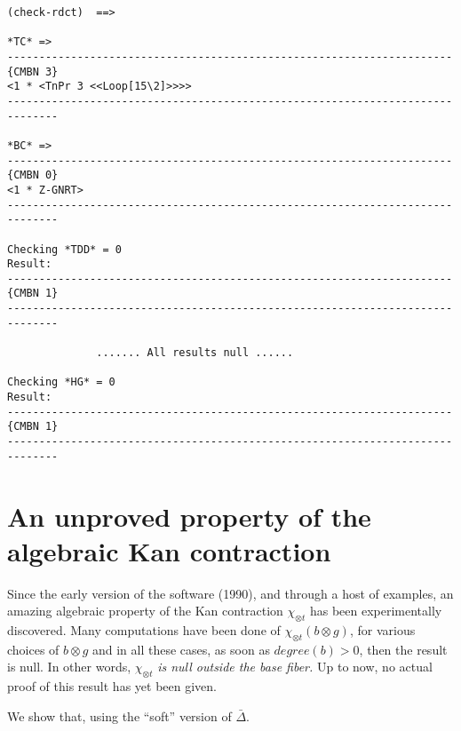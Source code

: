 {\begin{verbatim}
(check-rdct)  ==>

*TC* =>
----------------------------------------------------------------------{CMBN 3}
<1 * <TnPr 3 <<Loop[15\2]>>>>
------------------------------------------------------------------------------

*BC* =>
----------------------------------------------------------------------{CMBN 0}
<1 * Z-GNRT>
------------------------------------------------------------------------------

Checking *TDD* = 0
Result:
----------------------------------------------------------------------{CMBN 1}
------------------------------------------------------------------------------

              ....... All results null ......

Checking *HG* = 0
Result:
----------------------------------------------------------------------{CMBN 1}
------------------------------------------------------------------------------
\end{verbatim}}

\newpage

\section {An unproved property of the algebraic Kan contraction}

Since the early version of the software (1990), and through a host of examples,
an amazing algebraic property of the Kan contraction $\chi_{\otimes t}$ has
been experimentally discovered. Many computations have been done of
$\chi_{\otimes t}(b \otimes g)$, for various choices of $b \otimes g$
and in all these cases,  as soon as $degree(b) > 0$, then the result is null.
In other words,
$\chi_{\otimes t}$ {\em is null outside the base fiber.}
Up to now, no actual proof of this result has yet  been given. \par
We show that, using the ``soft'' version of $\bar{\Delta}$.

